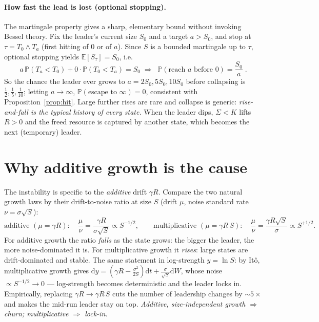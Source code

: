 \documentclass[11pt]{article}
\newcommand{\dd}{\mathrm{d}}
\newcommand{\E}{\mathbb{E}}
\newcommand{\Prob}{\mathbb{P}}
\begin{document}
\paragraph{How fast the lead is lost (optional stopping).} The martingale property
gives a sharp, elementary bound without invoking Bessel theory. Fix the leader's
current size $S_0$ and a target $a>S_0$, and stop at
$\tau=T_0\wedge T_a$ (first hitting of $0$ or of $a$). Since $S$ is a bounded
martingale up to $\tau$, optional stopping yields
$\E[S_\tau]=S_0$, i.e.
\begin{equation}
a\,\Prob(T_a<T_0)+0\cdot\Prob(T_0<T_a)=S_0
\;\Longrightarrow\;
\boxed{\;\Prob(\text{reach }a\text{ before }0)=\frac{S_0}{a}\;}.
\label{eq:OST}
\end{equation}
So the chance the leader ever grows to $a=2S_0,5S_0,10S_0$ before collapsing is
$\tfrac12,\tfrac15,\tfrac1{10}$; letting $a\to\infty$, $\Prob(\text{escape to }
\infty)=0$, consistent with Proposition~\ref{prop:hit}. Large further rises are
rare and collapse is generic: \emph{rise-and-fall is the typical history of every
state.} When the leader dips, $\Sigma<K$ lifts $R>0$ and the freed resource is
captured by another state, which becomes the next (temporary) leader.

\section{Why additive growth is the cause}\label{sec:additive}

The instability is specific to the \emph{additive} drift $\gamma R$. Compare the
two natural growth laws by their drift-to-noise ratio at size $S$ (drift $\mu$,
noise standard rate $\nu=\sigma\sqrt S$):
\begin{equation}
\text{additive }(\mu=\gamma R):\quad \frac{\mu}{\nu}=\frac{\gamma R}{\sigma\sqrt S}\propto S^{-1/2},
\qquad
\text{multiplicative }(\mu=\gamma R\,S):\quad \frac{\mu}{\nu}=\frac{\gamma R\sqrt S}{\sigma}\propto S^{+1/2}.
\end{equation}
For additive growth the ratio \emph{falls} as the state grows: the bigger the
leader, the more noise-dominated it is. For multiplicative growth it \emph{rises}:
large states are drift-dominated and stable. The same statement in log-strength
$y=\ln S$: by Itô, multiplicative growth gives
$\dd y=(\gamma R-\tfrac{\sigma^2}{2S})\dd t+\tfrac{\sigma}{\sqrt S}\dd W$, whose
noise $\propto S^{-1/2}\to0$ --- log-strength becomes deterministic and the leader
locks in. Empirically, replacing $\gamma R\to\gamma R\,S$ cuts the number of
leadership changes by $\sim5\times$ and makes the mid-run leader stay on top.
\emph{Additive, size-independent growth $\Rightarrow$ churn; multiplicative
$\Rightarrow$ lock-in.}
\end{document}

